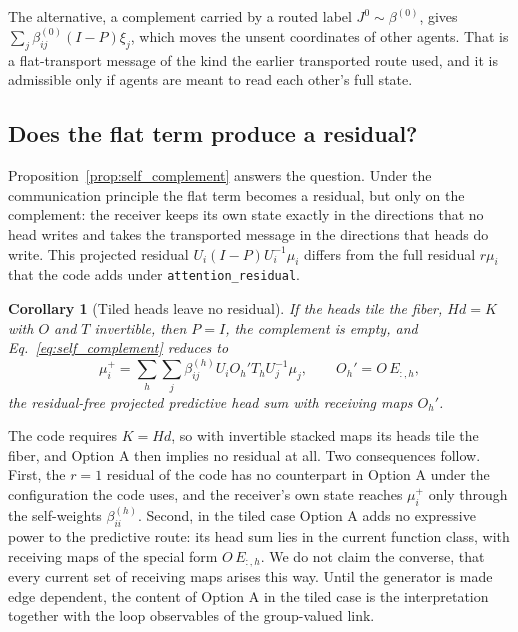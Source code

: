 \documentclass[11pt]{article}
\newtheorem{corollary}[proposition]{Corollary}
\theoremstyle{definition}
\theoremstyle{remark}
\newcommand{\cfg}[1]{\texttt{#1}}
\begin{document}
The alternative, a complement carried by a routed label $J^0\sim\beta^{(0)}$, gives $\sum_j\beta_{ij}^{(0)}(I-P)\xi_j$, which moves the unsent coordinates of other agents. That is a flat-transport message of the kind the earlier transported route used, and it is admissible only if agents are meant to read each other's full state.

\subsection{Does the flat term produce a residual?}

Proposition~\ref{prop:self_complement} answers the question. Under the communication principle the flat term becomes a residual, but only on the complement: the receiver keeps its own state exactly in the directions that no head writes and takes the transported message in the directions that heads do write. This projected residual $U_i(I-P)U_i^{-1}\mu_i$ differs from the full residual $r\mu_i$ that the code adds under \cfg{attention\_residual}.

\begin{corollary}[Tiled heads leave no residual]
\label{cor:tiled}
If the heads tile the fiber, $Hd=K$ with $O$ and $T$ invertible, then $P=I$, the complement is empty, and Eq.~\eqref{eq:self_complement} reduces to
\begin{equation}
\mu_i^+=\sum_h\sum_j\beta_{ij}^{(h)}U_iO_h'T_hU_j^{-1}\mu_j,\qquad O_h'=O\,E_{:,h},
\label{eq:tiled}
\end{equation}
the residual-free projected predictive head sum with receiving maps $O_h'$.
\end{corollary}

The code requires $K=Hd$, so with invertible stacked maps its heads tile the fiber, and Option A then implies no residual at all. Two consequences follow. First, the $r=1$ residual of the code has no counterpart in Option A under the configuration the code uses, and the receiver's own state reaches $\mu_i^+$ only through the self-weights $\beta_{ii}^{(h)}$. Second, in the tiled case Option A adds no expressive power to the predictive route: its head sum lies in the current function class, with receiving maps of the special form $O\,E_{:,h}$. We do not claim the converse, that every current set of receiving maps arises this way. Until the generator is made edge dependent, the content of Option A in the tiled case is the interpretation together with the loop observables of the group-valued link.
\end{document}
